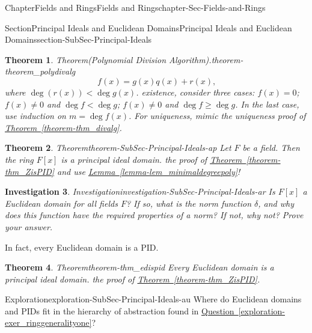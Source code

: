 \documentclass[oneside,10pt,]{book}
\newcommand{\xreffont}{\relax}
\numberwithin{equation}{section}
\renewcommand{\ge}{\geqslant}
\newtheorem{theorem}{Theorem}[section]
\newtheorem{investigation}[theorem]{Investigation}
\newcommand{\lt}{<}
\begin{document}
\begin{chapterptx}{Chapter}{Fields and Rings}{}{Fields and Rings}{}{}{chapter-Sec-Fields-and-Rings}
\begin{sectionptx}{Section}{Principal Ideals and Euclidean Domains}{}{Principal Ideals and Euclidean Domains}{}{}{section-SubSec-Principal-Ideals}
\begin{theorem}{Theorem}{(Polynomial Division Algorithm).}{}{theorem-theorem_polydivalg}
\begin{equation*}
f(x) = g(x) q(x) + r(x)\text{,}
\end{equation*}
where \(\deg(r(x)) \lt  \deg g(x)\).%
\noindentFor existence, consider three cases: \(f(x) = 0\); \(f(x) \ne 0\) and \(\deg f \lt \deg g\); \(f(x) \ne 0\) and \(\deg f \ge \deg g\). In the last case, use induction on \(m = \deg f(x)\). For uniqueness, mimic the uniqueness proof of \hyperref[theorem-thm_divalg]{Theorem~{\xreffont\ref{theorem-thm_divalg}}}.%
\end{theorem}
%
\begin{theorem}{Theorem}{}{}{theorem-SubSec-Principal-Ideals-ap}%
Let \(F\) be a field. Then the ring \(F[x]\) is a principal ideal domain.%
\noindentMimic the proof of \hyperref[theorem-thm_ZisPID]{Theorem~{\xreffont\ref{theorem-thm_ZisPID}}} and use \hyperref[lemma-lem_minimaldegreepoly]{Lemma~{\xreffont\ref{lemma-lem_minimaldegreepoly}}}!%
\end{theorem}
\begin{investigation}{Investigation}{}{investigation-SubSec-Principal-Ideals-ar}%
Is \(F[x]\) a Euclidean domain for all fields \(F\)? If so, what is the norm function \(\delta\), and why does this function have the required properties of a norm? If not, why not? Prove your answer.%
\end{investigation}%
In fact, every Euclidean domain is a PID.%
\begin{theorem}{Theorem}{}{}{theorem-thm_edispid}%
Every Euclidean domain is a principal ideal domain.%
\noindentMimic the proof of \hyperref[theorem-thm_ZisPID]{Theorem~{\xreffont\ref{theorem-thm_ZisPID}}}.%
\end{theorem}
\begin{exploration}{Exploration}{}{exploration-SubSec-Principal-Ideals-au}%
Where do Euclidean domains and PIDs fit in the hierarchy of abstraction found in \hyperref[exploration-exer_ringgeneralityone]{Question~{\xreffont\ref{exploration-exer_ringgeneralityone}}}?%
\end{exploration}%
\end{sectionptx}
\end{chapterptx}
%
%
\typeout{************************************************}
\typeout{************************************************}
%
\end{document}
